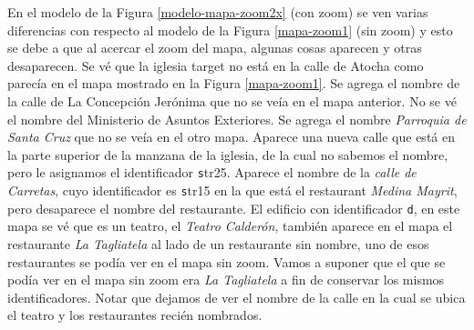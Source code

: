En el modelo de la Figura \ref{modelo-mapa-zoom2x} (con zoom) se ven varias diferencias con respecto al modelo de la Figura \ref{mapa-zoom1} 
(sin zoom) y esto se debe a que al acercar el zoom del mapa, algunas cosas aparecen y otras desaparecen. Se v\'e que la iglesia target no est\'a
 en la calle de Atocha como parec\'ia en el mapa mostrado en la Figura \ref{mapa-zoom1}. Se agrega el nombre de la calle de La Concepci\'on 
Jer\'onima que no se ve\'ia en el mapa anterior. No se v\'e el nombre del Ministerio de Asuntos Exteriores. Se agrega el nombre {\it Parroquia de Santa Cruz} que no se ve\'ia en el otro mapa. Aparece una nueva calle que est\'a en la parte superior de la manzana de la iglesia, 
de la cual no sabemos el nombre, pero le asignamos el identificador {\texttt str25}. Aparece el nombre de la {\it calle de Carretas}, 
cuyo identificador
 es {\texttt str15} en la que est\'a el restaurant {\it Medina Mayrit}, pero desaparece el nombre del restaurante. 
El edificio con identificador {\texttt d}, en este mapa se v\'e que es un teatro, el {\it Teatro Calder\'on}, tambi\'en aparece en el mapa el restaurante {\it La Tagliatela} al lado
 de un restaurante sin nombre, uno de esos restaurantes se pod\'ia ver en el mapa sin zoom. Vamos a suponer que el que se pod\'ia ver en el mapa sin zoom era {\it La Tagliatela} a fin de conservar los mismos identificadores. Notar que dejamos de ver el nombre de la calle 
en la cual se ubica el teatro y los restaurantes reci\'en nombrados.


